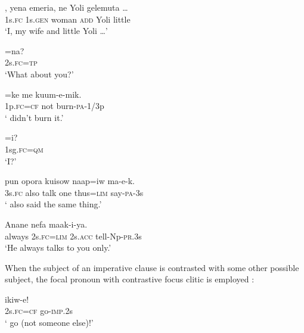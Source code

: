 \ea%
\label{ex:3:x541}
\gll {}, yena emeria, ne Yoli gelemuta {\dots} \\
1s.\textsc{fc} 1s.\textsc{gen} woman \textsc{add} Yoli little\\
\glt`I, my wife and little Yoli {\dots}'
\z

\ea%
\label{ex:3:x542}
\gll {}=na? \\
2s.\textsc{fc}=\textsc{tp}\\
\glt`What about you?'
\z

\ea%
\label{ex:3:x543}
\gll {}=ke me kuum-e-mik. \\
1p.\textsc{fc}=\textsc{cf} not burn-\textsc{pa}-1/3p\\
\glt` didn't burn it.'
\z

\ea%
\label{ex:3:x544}
\gll {}=i? \\
1sg.\textsc{fc}=\textsc{qm}\\
\glt`I?' 
\z

\ea%
\label{ex:3:x546}
\gll {} pun opora kuisow naap=iw ma-e-k. \\
3s.\textsc{fc} also talk one thus=\textsc{lim} say-\textsc{pa}-3s\\
\glt` also said the same thing.'
\z

\ea%
\label{ex:3:x545}
\gll Anane  nefa maak-i-ya. \\
always 2s.\textsc{fc}=\textsc{lim} 2s.\textsc{acc} tell-Np-\textsc{pr}.3s\\
\glt`He always talks to you only.'
\z

When the subject of an imperative clause is contrasted with some other possible subject, the focal pronoun with contrastive focus clitic is employed : 

\ea%
\label{ex:3:x629}
\gll {} ikiw-e! \\
2s.\textsc{fc}=\textsc{cf} go-\textsc{imp}.2s\\
\glt` go (not someone else)!'
\z


